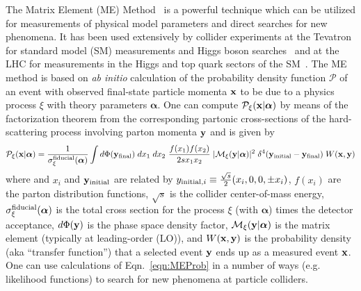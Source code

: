 The Matrix Element (ME) Method~\cite{Kondo:1988yd,Fiedler:2010sg,2011arXiv1101.2259V,Elahi:2017ppe} is a powerful technique which can be utilized for measurements of physical model parameters and direct searches for new phenomena. It has been used extensively by collider experiments at the Tevatron for standard model (SM) measurements and Higgs boson searches~\cite{Abazov:2004cs,Abulencia:2006ry,Aaltonen:2008mv,Aaltonen:2010cm,Abazov:2009ii,Aaltonen:2009jj} and at the LHC for measurements in the Higgs and top quark sectors of the SM~\cite{Chatrchyan:2012xdj,Chatrchyan:2013mxa,Aad:2014eva,Khachatryan:2015tzo, Khachatryan:2015ila,Aad:2015gra,Aad:2015upn}. The ME method is based on \emph{ab initio} calculation of the probability density function $\mathcal{P}$ of an event with observed final-state particle momenta ${\bf x}$ to be due to a physics process $\xi$ with theory parameters $\boldsymbol\alpha$. One can compute $\mathcal{P}_{\xi}({\bf x}|{\boldsymbol\alpha})$ by means of the factorization theorem from the corresponding partonic cross-sections of the hard-scattering process involving parton momenta ${\bf y}$ and is given by
\begin{equation}
 \mathcal{P}_{\xi}({\bf x}|{\boldsymbol\alpha}) = \frac{1}{\sigma^{\rm fiducial}_{\xi}(\boldsymbol\alpha)} \int d\Phi ({\bf y}_{\rm final}) \; dx_1 \; dx_2~\frac{f(x_1)f(x_2)}{2s x_1 x_2} \; |\mathcal{M}_{\xi}({\bf y}|\boldsymbol\alpha)|^2 \; \delta^{4}({\bf y}_{\rm initial}-{\bf y}_{\rm final}) \; W({\bf x}, {\bf y})
 \label{eqn:MEProb}
\end{equation}
where and $x_i$ and ${\bf y}_{{\rm initial}}$ are related by $y_{{\rm initial},i}\equiv \frac{\sqrt{s}}{2}(x_i,0,0,\pm x_i)$, $f(x_i)$ are the parton distribution functions, $\sqrt{s}$ is the collider center-of-mass energy, $\sigma^{\rm fiducial}_{\xi}(\boldsymbol\alpha)$ is the total cross section for the process $\xi$ (with $\boldsymbol\alpha$) times the detector acceptance, $d\Phi({\bf y})$ is the phase space density factor, $\mathcal{M}_{\xi}({\bf y}|\boldsymbol\alpha)$ is the matrix element (typically at leading-order (LO)), and $W({\bf x}, {\bf y})$ is the probability density (aka ``transfer function'') that a selected event ${\bf y}$ ends up as a measured event ${\bf x}$. One can use calculations of Eqn.~\ref{eqn:MEProb} in a number of ways (e.g. likelihood functions) to search for new phenomena at particle colliders.

